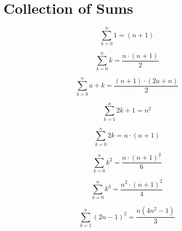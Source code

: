 \documentclass[./\jobname.tex]{subfiles}
\begin{document}
\chapter{Collection of Sums}

\begin{equation*}
\sum_{k = 0}^{n} 1 = (n +1)
\end{equation*}

\noindent\makebox[\linewidth]{\rule{\paperwidth}{0.4pt}}

\begin{equation*}
	\sum_{k=0}^{n} k = \frac{n \cdot (n + 1)}{2}
\end{equation*}

\noindent\makebox[\linewidth]{\rule{\paperwidth}{0.4pt}}

\begin{equation*}
	\sum_{k=0}^{n} a + k = \frac{(n + 1) \cdot (2a + n)}{2}
\end{equation*}

\noindent\makebox[\linewidth]{\rule{\paperwidth}{0.4pt}}

\begin{equation*}
	\sum_{k = 1}^{n} 2k + 1 = n^2
\end{equation*}

\noindent\makebox[\linewidth]{\rule{\paperwidth}{0.4pt}}

\begin{equation*}
	\sum_{k = 0}^{n} 2k = n \cdot (n + 1)
\end{equation*}

\noindent\makebox[\linewidth]{\rule{\paperwidth}{0.4pt}}

\begin{equation*}
	\sum_{k = 0}^{n} k^2 = \frac{n \cdot (n + 1)^2}{6}
\end{equation*}

\noindent\makebox[\linewidth]{\rule{\paperwidth}{0.4pt}}

\begin{equation*}
	\sum_{k = 0}^{n} k^3 = \frac{n^2 \cdot (n + 1)^2}{4}
\end{equation*}

\noindent\makebox[\linewidth]{\rule{\paperwidth}{0.4pt}}

\begin{equation*}
	\sum_{k = 1}^{n} (2n - 1)^2 = \frac{n(4n^2 - 1)}{3}
\end{equation*}

\noindent\makebox[\linewidth]{\rule{\paperwidth}{0.4pt}}
\end{document}
